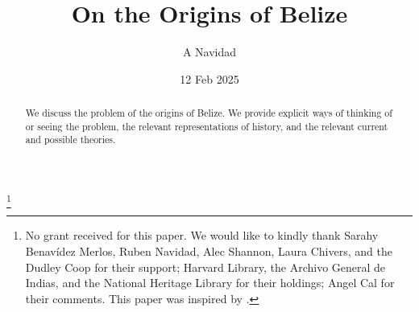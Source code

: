\documentclass[draft]{amsart} %
\theoremstyle{definition}
\theoremstyle{remark}
\begin{document}
%
%
\title{On the Origins of Belize}
\author{A Navidad}
\address{Harvard College, Cambridge, Mass, USA}
\date{12 Feb 2025}
\thanks{No grant received for this paper. We would like to kindly thank Sarahy Benavídez Merlos, Ruben Navidad, Alec Shannon, Laura Chivers, and the Dudley Coop for their support; Harvard Library, the Archivo General de Indias, and the National Heritage Library for their holdings; Angel Cal for their comments. This paper was inspired by .} %
\begin{abstract}
We discuss the problem of the origins of Belize. We provide explicit ways of thinking of or seeing the problem, the relevant representations of history, and the relevant current and possible theories.
\end{abstract}
\maketitle
%
\end{document}
